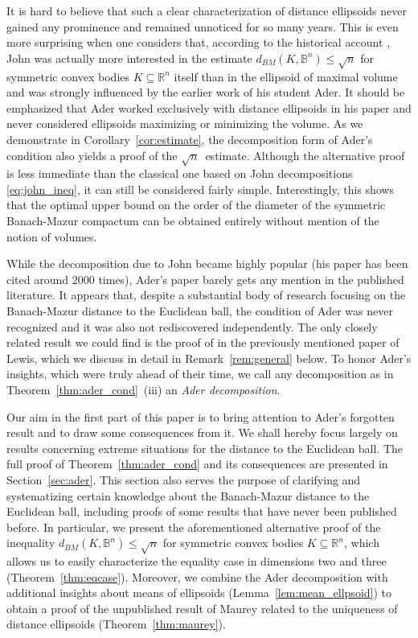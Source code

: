 \documentclass[12pt,a4paper]{article}
\theoremstyle{definition}
\newcommand\R{\mathbb{R}}
\newcommand\B{\mathbb{B}}
\newcommand\cemph[1]{\emph{\color{red}#1}}
\begin{document}
It is hard to believe that such a clear characterization of distance ellipsoids never gained any prominence and remained unnoticed for so many years. This is even more surprising when one considers that, according to the historical account \cite{kuhn}, John was actually more interested in the estimate $d_{BM}(K, \B^n) \leq \sqrt{n}$ for symmetric convex bodies $K \subseteq \R^n$ itself than in the ellipsoid of maximal volume and was strongly influenced by the earlier work of his student Ader. It should be emphasized that Ader worked exclusively with distance ellipsoids in his paper and never considered ellipsoids maximizing or minimizing the volume. As we demonstrate in Corollary~\ref{cor:estimate}, the decomposition form of Ader's condition also yields a proof of the $\sqrt{n}$~estimate. Although the alternative proof is less immediate than the classical one based on John decompositions \eqref{eq:john_ineq}, it can still be considered fairly simple. Interestingly, this shows that the optimal upper bound on the order of the diameter of the symmetric Banach-Mazur compactum can be obtained entirely without mention of the notion of volumes.

While the decomposition due to John became highly popular (his paper has been cited around $2000$ times), Ader's paper barely gets any mention in the published literature. It appears that, despite a substantial body of research focusing on the Banach-Mazur distance to the Euclidean ball, the condition of Ader was never recognized and it was also not rediscovered independently. The only closely related result we could find is the proof of \cite[Theorem~$2.1$]{lewis} in the previously mentioned paper of Lewis, which we discuss in detail in Remark~\ref{rem:general} below. To honor Ader's insights, which were truly ahead of their time, we call any decomposition as in Theorem~\ref{thm:ader_cond}~(iii) an \cemph{Ader decomposition}.

Our aim in the first part of this paper is to bring attention to Ader's forgotten result and to draw some consequences from it. We shall hereby focus largely on results concerning extreme situations for the distance to the Euclidean ball. The full proof of Theorem~\ref{thm:ader_cond} and its consequences are presented in Section~\ref{sec:ader}. This section also serves the purpose of clarifying and systematizing certain knowledge about the Banach-Mazur distance to the Euclidean ball, including proofs of some results that have never been published before. In particular, we present the aforementioned alternative proof of the inequality $d_{BM}(K, \B^n) \leq \sqrt{n}$ for symmetric convex bodies $K \subseteq \R^n$, which allows us to easily characterize the equality case in dimensions two and three (Theorem~\ref{thm:eqcase}). Moreover, we combine the Ader decomposition with additional insights about means of ellipsoids (Lemma~\ref{lem:mean_ellpsoid}) to obtain a proof of the unpublished result of Maurey related to the uniqueness of distance ellipsoids (Theorem~\ref{thm:maurey}).
\end{document}
